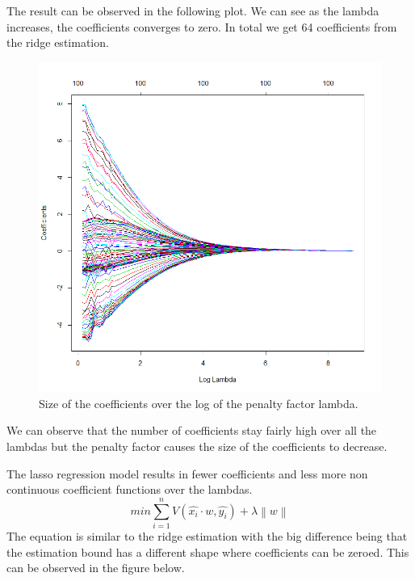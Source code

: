 \documentclass[a4paper,12pt]{article}
\begin{document}
The result can be observed in the following plot. We can see as the lambda increases, the coefficients converges to zero. In total we get 64 coefficients from the ridge estimation.

\begin{figure}[H]
\centering
\begin{minipage}[]{0.75\textwidth}
  \includegraphics[width=\textwidth]{figures/Lab2A2_coef_ridge.png}  
  \caption{Size of the coefficients over the log of the penalty factor lambda.}
 \end{minipage}
\end{figure}
We can observe that the number of coefficients stay fairly high over all the lambdas but the penalty factor causes the size of the coefficients to decrease.

The lasso regression model results in fewer coefficients and less more non continuous coefficient functions over the lambdas.
\begin{equation}
  min \sum_{i = 1}^n{V(\hat{x_i}\cdot w,\hat{y_i}) + \lambda\left \| w \right \|}
\end{equation}
The equation is similar to the ridge estimation with the big difference being that the estimation bound has a different shape where coefficients can be zeroed. This can be observed in the figure below.
\end{document}
